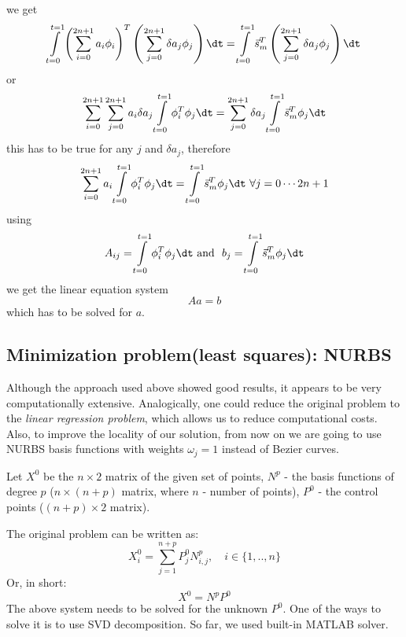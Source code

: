 we get
\begin{equation}
\int\limits_{t=0}^{t=1} \left(\sum\limits_{i=0}^{2n+1} a_{i}\phi_i
\right)^T
\left(\sum\limits_{j=0}^{2n+1}
\delta a_{j} \phi_j\right)\dt 
=
\int\limits_{t=0}^{t=1}\vec{s}_m^T \left(\sum\limits_{j=0}^{2n+1} \delta a_{j} \phi_j\right)\dt
\end{equation}
or
\begin{equation}
\sum\limits_{i=0}^{2n+1} \sum\limits_{j=0}^{2n+1}
a_{i} \delta a_{j}\int\limits_{t=0}^{t=1} \phi_i^T
\phi_j\dt 
=
\sum\limits_{j=0}^{2n+1} \delta a_{j} \int\limits_{t=0}^{t=1}\vec{s}_m^T \phi_j\dt
\end{equation}
this has to be true for any $j$ and $\delta a_j$, therefore 
\begin{equation}
\sum\limits_{i=0}^{2n+1} a_{i} \int\limits_{t=0}^{t=1} \phi_i^T
\phi_j\dt 
=
\int\limits_{t=0}^{t=1}\vec{s}_m^T \phi_j\dt \ \forall j=0\cdots 2n+1
\end{equation}
using
\begin{equation}
A_{ij}=\int\limits_{t=0}^{t=1} \phi_i^T
\phi_j\dt 
\text{\ and \ }
b_j=\int\limits_{t=0}^{t=1}\vec{s}_m^T \phi_j\dt
\end{equation}
we get the linear equation system
\begin{equation}
A a = b
\end{equation}
which has to be solved for $a$.

\subsection{Minimization problem(least squares): NURBS}
Although the approach used above showed good results, it appears to be very computationally extensive. Analogically, one could reduce the original problem to the \textit{linear regression problem}, which allows us to reduce computational costs. Also, to improve the locality of our solution, from now on we are going to use NURBS basis functions with weights $\omega_{j} = 1$ instead of Bezier curves.

Let $X^{0}$ be the $n \times 2$ matrix of the given set of points, $N^{p}$ - the basis functions of degree $p$ ($n \times (n+p)$ matrix, where $n$ - number of points), $P^{0}$ - the control points ($(n+p) \times 2$ matrix).

The original problem can be written as:
\begin{equation}
X_{i}^{0} = \sum\limits_{j=1}^{n+p} P_{j}^{0} N_{i,j}^{p}, \quad i \in \{1,..,n\}
\end{equation}
Or, in short:
\begin{equation}
X^{0} = N^{p} P^{0}
\end{equation}
The above system needs to be solved for the unknown $P^{0}$. One of the ways to solve it is to use SVD decomposition. So far, we used built-in MATLAB solver.
